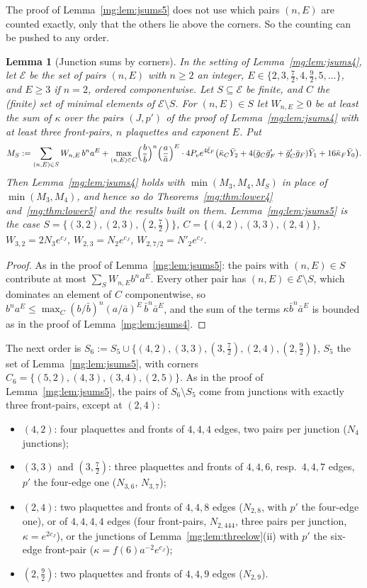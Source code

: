 \documentclass[11pt,a4paper]{article}
\newtheorem{lemma}[theorem]{Lemma}
\theoremstyle{definition}
\theoremstyle{remark}
\begin{document}
The proof of Lemma~\ref{mg:lem:jsums5} does not use which pairs $(n,E)$ are counted exactly, only that the others lie above the corners. So the counting can be pushed to any order.

\begin{lemma}[Junction sums by corners]\label{mg:lem:corners}
In the setting of Lemma~\ref{mg:lem:jsums4}, let $\mathcal E$ be the set of pairs $(n,E)$ with $n\ge2$ an integer, $E\in\{2,3,\frac72,4,\frac92,5,\dots\}$, and $E\ge3$ if $n=2$, ordered
componentwise. Let $S\subseteq\mathcal E$ be finite, and $C$ the (finite) set of minimal elements of $\mathcal E\setminus S$. For $(n,E)\in S$ let $W_{n,E}\ge0$ be
at least the sum of $\kappa$ over the pairs $(J,p')$ of the proof of Lemma~\ref{mg:lem:jsums4} with at least three front-pairs, $n$ plaquettes and exponent $E$. Put
\[
M_S:=\sum_{(n,E)\in S}W_{n,E}\,b^na^E+\max_{(n,E)\in C}\Bigl(\frac b{\bar b}\Bigr)^n\Bigl(\frac a{\bar a}\Bigr)^E\cdot4P_ve^{4\bar\xi_F}\bigl(\bar\kappa_C\bar Y_2+4(\bar g_C\bar g'_F+\bar g'_C\bar g_F)\bar Y_1+16\bar\kappa_F\bar Y_0\bigr).
\]
Then Lemma~\ref{mg:lem:jsums4} holds with $\min(M_3,M_4,M_S)$ in place of $\min(M_3,M_4)$, and hence so do Theorems~\ref{mg:thm:lower4} and~\ref{mg:thm:lower5} and the
results built on them. Lemma~\ref{mg:lem:jsums5} is the case $S=\{(3,2),(2,3),(2,\frac72)\}$, $C=\{(4,2),(3,3),(2,4)\}$,
$W_{3,2}=2N_3e^{c_J}$, $W_{2,3}=N_2e^{c_J}$, $W_{2,7/2}=N'_2e^{c_J}$.
\end{lemma}

\begin{proof}
As in the proof of Lemma~\ref{mg:lem:jsums5}: the pairs with $(n,E)\in S$ contribute at most $\sum_SW_{n,E}b^na^E$. Every other pair has $(n,E)\in\mathcal E\setminus S$, which dominates an element of
$C$ componentwise, so $b^na^E\le\max_C(b/\bar b)^n(a/\bar a)^E\,\bar b^n\bar a^E$, and the sum of the terms $\kappa\bar b^n\bar a^E$ is bounded as in the proof of Lemma~\ref{mg:lem:jsums4}.
\end{proof}

The next order is $S_6:=S_5\cup\{(4,2),(3,3),(3,\frac72),(2,4),(2,\frac92)\}$, $S_5$ the set of Lemma~\ref{mg:lem:jsums5}, with corners $C_6=\{(5,2),(4,3),(3,4),(2,5)\}$. As in the proof
of Lemma~\ref{mg:lem:jsums5}, the pairs of $S_6\setminus S_5$ come from junctions with exactly three front-pairs, except at $(2,4)$:
\begin{itemize}
\item $(4,2)$: four plaquettes and fronts of $4,4,4$ edges, two pairs per junction ($N_4$ junctions);
\item $(3,3)$ and $(3,\frac72)$: three plaquettes and fronts of $4,4,6$, resp.\ $4,4,7$ edges, $p'$ the four-edge one ($N_{3,6}$, $N_{3,7}$);
\item $(2,4)$: two plaquettes and fronts of $4,4,8$ edges ($N_{2,8}$, with $p'$ the four-edge one), or of $4,4,4,4$ edges (four front-pairs, $N_{2,444}$, three pairs per
junction, $\kappa=e^{2c_J}$), or the junctions of Lemma~\ref{mg:lem:threelow}(ii) with $p'$ the six-edge front-pair ($\kappa=f(6)a^{-2}e^{c_J}$);
\item $(2,\frac92)$: two plaquettes and fronts of $4,4,9$ edges ($N_{2,9}$).
\end{itemize}
\end{document}
